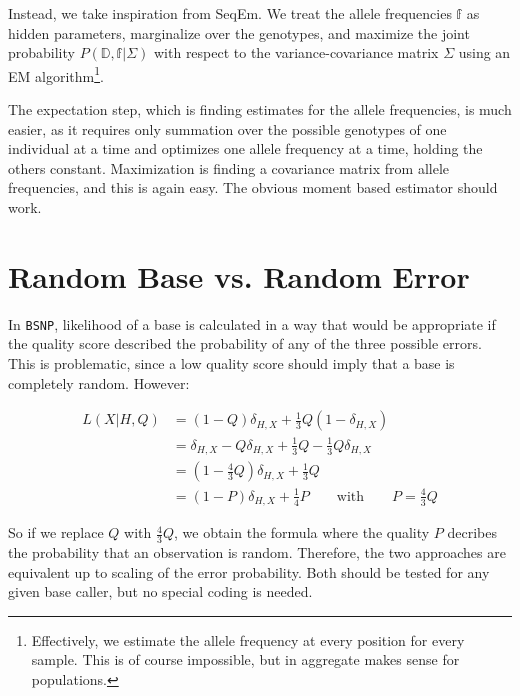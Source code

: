\documentclass{article}
\begin{document}
Instead, we take inspiration from SeqEm\cite{seqem}.  We treat the
allele frequencies $\mathbb{f}$ as hidden parameters, marginalize over
the genotypes, and maximize the joint probability $P(\mathbb{D},
\mathbb{f} | \Sigma)$ with respect to the variance-covariance matrix
$\Sigma$ using an EM algorithm\footnote{Effectively, we estimate the
allele frequency at every position for every sample.  This is of course
impossible, but in aggregate makes sense for populations.}.

The expectation step, which is finding estimates for the allele
frequencies, is much easier, as it requires only summation over the
possible genotypes of one individual at a time and optimizes one allele
frequency at a time, holding the others constant.  Maximization is
finding a covariance matrix from allele frequencies, and this is again
easy.  The obvious moment based estimator should work.



\appendix

\section{Random Base vs. Random Error}
\label{app_errprob}

In \texttt{BSNP}, likelihood of a base is calculated in a way that would be appropriate if the quality score described the
probability of any of the three possible errors.  This is problematic, since a low quality score should imply that a base is
completely random.  However:

\begin{align*}
L(X|H,Q) &= (1-Q)\delta_{H,X} + \frac{1}{3} Q (1-\delta_{H,X}) \\
&= \delta_{H,X} - Q\delta_{H,X} + \frac{1}{3}Q - \frac{1}{3}Q\delta_{H,X} \\
&= (1-\frac{4}{3}Q)\delta_{H,X} + \frac{1}{3}Q \\
&= (1-P) \delta_{H,X} + \frac{1}{4}P \qquad \mbox{with} \qquad P=\frac{4}{3}Q
\end{align*}

So if we replace $Q$ with $\frac{4}{3}Q$, we obtain the formula where the quality $P$ decribes the probability that an observation
is random.  Therefore, the two approaches are equivalent up to scaling of the error probability.  Both should be tested for any
given base caller, but no special coding is needed.
\end{document}
